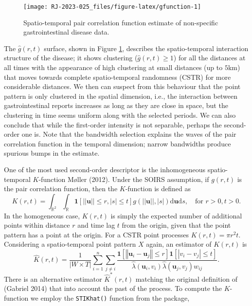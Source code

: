 \begin{figure}

{\centering \texttt{[image: RJ-2023-025\_files/figure-latex/gfunction-1]} 

}

\caption{Spatio-temporal pair correlation function estimate of non-specific gastrointestinal disease data.}\label{fig:gfunction}
\end{figure}

The \(\hat{g}(r,t)\) surface, shown in Figure \ref{fig:gfunction}, describes the spatio-temporal interaction structure of the disease; it shows clustering (\(\hat{g}(r,t)\geq 1\)) for all the distances at all times with the appearance of high clustering at small distances (up to \(5\)km) that moves towards complete spatio-temporal randomness (CSTR) for more considerable distances. We then can suspect from this behaviour that the point pattern is only clustered in the spatial dimension, i.e., the interaction between gastrointestinal reports increases as long as they are close in space, but the clustering in time seems uniform along with the selected periods. We can also conclude that while the first-order intensity is not separable, perhaps the second-order one is. Note that the bandwidth selection explains the waves of the pair correlation function in the temporal dimension; narrow bandwidths produce spurious bumps in the estimate.

One of the most used second-order descriptor is the inhomogeneous spatio-temporal \(K\)-function Møller (2012). Under the SOIRS assumption, if \(g(r,t)\) is the pair correlation function, then the \(K\)-function is defined as
\[
    K(r,t) = \int_{\mathbb{R}^2}\int_{\mathbb{R}} \mathbf{1}[||\mathbf{u}||\leq r, |s|\leq t] g(||\mathbf{u}||,|s|)  \text{d} \mathbf{u} \text{d} s, \quad \text{for }r>0,t>0.
\]
In the homogeneous case, \(K(r,t)\) is simply the expected number of additional points within distance \(r\) and time lag \(t\) from the origin, given that the point pattern has a point at the origin. For a CSTR point processes \(K(r,t)= \pi r^2 t\). Considering a spatio-temporal point pattern \(X\) again, an estimator of \(K(r,t)\) is
\[
    \hat{K}(r,t)= \frac{1}{|W\times T|}\sum_{i=1}^n \sum_{j\neq i}
    \frac{\mathbf{1}\left[ \left\Vert \mathbf{u}_{i}-\mathbf{u}_{j}\right\Vert \leq r\right]\mathbf{1}\left[\left\vert v_{i}-v_{j}\right\vert \leq t\right]}{\hat{\lambda} \left( \mathbf{u}_{i},v_{i}\right) \hat{\lambda} \left(\mathbf{u}_{j},v_{j}\right) w_{ij}}.
\]
There is an alternative estimator \(\hat{K}^*(r,t)\) matching the original definition of (Gabriel 2014) that into account the past of the process. To compute the \(K\)-function we employ the \texttt{STIKhat()} function from the  package,


